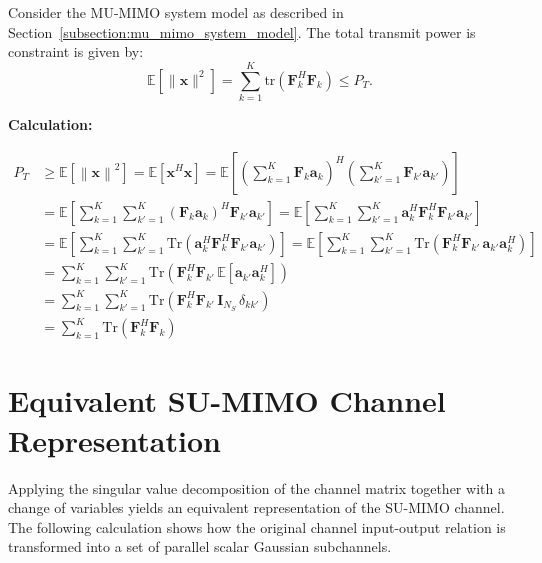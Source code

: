 Consider the \ac{MU}-\ac{MIMO} system model as described in Section~\ref{subsection:mu_mimo_system_model}.
The total transmit power is constraint is given by:
\begin{equation*}
    \mathbb{E}\!\left[\|\mathbf{x}\|^2\right] = \sum_{k=1}^{K} \mathrm{tr}\!\left(\mathbf{F}_k^H \mathbf{F}_k\right) \leq P_T.
\end{equation*}

\textbf{Calculation:}
\begin{fleqn}[2.5em]
\begin{subequations}
\begin{align*}
    P_T
    &\geq \mathbb{E}\!\left[ \left\|\mathbf{x}\right\|^2 \right]
    = \mathbb{E}\!\left[ \mathbf{x}^H \mathbf{x} \right]
    = \mathbb{E}\!\left[ \left(\sum_{k=1}^{K} \mathbf{F}_k \mathbf{a}_k\right)^H \left(\sum_{k'=1}^{K} \mathbf{F}_{k'} \mathbf{a}_{k'}\right) \right] \\
    &= \mathbb{E}\!\left[ \sum_{k=1}^{K} \sum_{k'=1}^{K} \left(\mathbf{F}_k \mathbf{a}_k \right)^H \mathbf{F}_{k'} \mathbf{a}_{k'} \right]
    = \mathbb{E}\!\left[ \sum_{k=1}^{K} \sum_{k'=1}^{K} \mathbf{a}_k^H \mathbf{F}_k^H \mathbf{F}_{k'} \mathbf{a}_{k'} \right] \\
    &= \mathbb{E}\!\left[ \sum_{k=1}^{K} \sum_{k'=1}^{K} \text{Tr}\!\left( \mathbf{a}_k^H \mathbf{F}_k^H \mathbf{F}_{k'} \mathbf{a}_{k'} \right) \right]
    = \mathbb{E}\!\left[ \sum_{k=1}^{K} \sum_{k'=1}^{K} \text{Tr}\!\left( \mathbf{F}_k^H \mathbf{F}_{k'} \, \mathbf{a}_{k'} \mathbf{a}_k^H \right) \right] \\
    &= \sum_{k=1}^{K} \sum_{k'=1}^{K} \text{Tr}\!\left( \mathbf{F}_k^H \mathbf{F}_{k'} \, \mathbb{E}\!\left[ \mathbf{a}_{k'} \mathbf{a}_k^H \right] \right) \\
    &= \sum_{k=1}^{K} \sum_{k'=1}^{K} \text{Tr}\!\left( \mathbf{F}_k^H \mathbf{F}_{k'} \, \mathbf{I}_{N_S} \, \delta_{kk'} \right) \\
    &= \sum_{k=1}^{K} \text{Tr}\!\left( \mathbf{F}_k^H \mathbf{F}_{k} \right)
\end{align*}
\end{subequations}
\end{fleqn}

\section*{Equivalent SU-MIMO Channel Representation}
\label{calculation:su_mimo_equivalent_channel}

Applying the singular value decomposition of the channel matrix together with a change of variables yields an equivalent representation of the \ac{SU}-\ac{MIMO} channel. The following calculation shows how the original channel input-output relation is transformed into a set of parallel scalar Gaussian subchannels.

